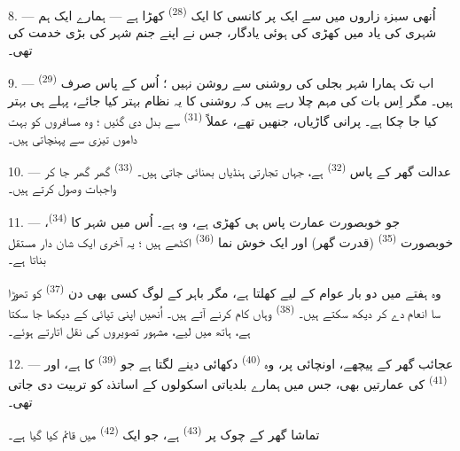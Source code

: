 8. --- اُنھی سبزہ زاروں میں سے ایک پر کانسی کا ایک 
\textsuperscript{(28)} کھڑا ہے — ہمارے ایک ہم شہری کی یاد میں کھڑی کی
ہوئی یادگار، جس نے اپنے جنم شہر کی بڑی خدمت کی تھی۔

\VUsaut{4.0mm}
\VUsaut{3.4mm}

9. --- اب تک ہمارا شہر بجلی کی روشنی سے روشن نہیں ؛ اُس کے پاس صرف
 \textsuperscript{(29)} ہیں۔ مگر  اِس بات کی مہم چلا رہے ہیں کہ روشنی کا یہ نظام بہتر کیا
جائے،   پہلے ہی بہتر کیا
جا چکا ہے۔  پرانی گاڑیاں، جنھیں 
 تھے، عملاً 
\textsuperscript{(31)} سے بدل دی گئیں ؛ وہ مسافروں کو  بہت  داموں تیزی سے پہنچاتی ہیں۔

10. --- عدالت گھر کے پاس  \textsuperscript{(32)} ہے، جہاں
تجارتی ہنڈیاں بھنائی جاتی ہیں۔ 
\textsuperscript{(33)} گھر گھر جا کر واجبات وصول کرتے ہیں۔

\VUsaut{4.0mm}
\VUsaut{3.4mm}

11. --- جو خوبصورت عمارت پاس ہی کھڑی ہے، وہ  ہے۔
اُس میں شہر کا  \textsuperscript{(34)}،
 خوبصورت  \textsuperscript{(35)}
(قدرت گھر) اور ایک خوش نما  \textsuperscript{(36)}
اکٹھے ہیں ؛ یہ آخری ایک شان دار مستقل  بناتا ہے۔

وہ ہفتے میں دو بار عوام کے لیے کھلتا ہے، مگر باہر کے لوگ کسی بھی دن
 \textsuperscript{(37)} کو تھوڑا سا انعام دے کر دیکھ
سکتے ہیں۔  \textsuperscript{(38)} وہاں کام کرنے آتے ہیں۔
اُنھیں اپنی تپائی کے  دیکھا جا سکتا ہے، ہاتھ میں
 لیے، مشہور تصویروں کی نقل اتارتے ہوئے۔

12. --- عجائب گھر کے پیچھے، اونچائی پر، وہ 
\textsuperscript{(40)} دکھائی دینے لگتا ہے جو 
\textsuperscript{(39)} کا ہے، اور 
\textsuperscript{(41)} کی عمارتیں بھی، جس میں ہمارے بلدیاتی اسکولوں کے
اساتذہ کو تربیت دی جاتی تھی۔

تماشا گھر کے چوک پر  \textsuperscript{(43)} ہے، جو
ایک  \textsuperscript{(42)} میں قائم کیا گیا ہے۔

\VUsaut{5.0mm}
\VUsaut{3.0mm}


